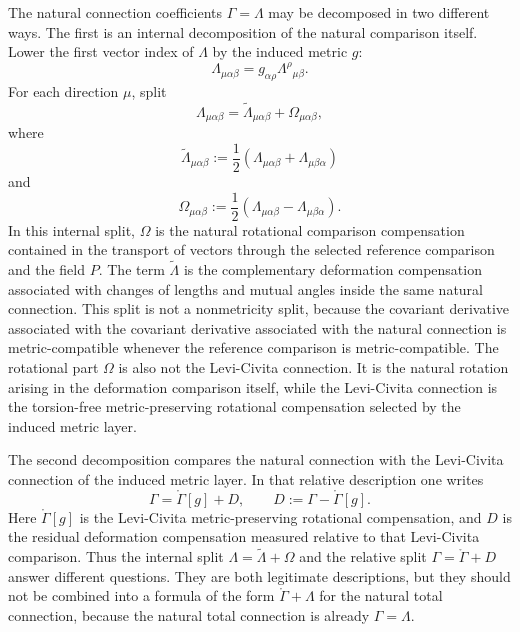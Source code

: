 \documentclass[12pt]{amsart}
\theoremstyle{definition}
\theoremstyle{remark}
\begin{document}
The natural connection coefficients \(\Gamma=\Lambda\) may be decomposed in two different ways.  The first is an internal decomposition of the natural comparison itself.  Lower the first vector index of \(\Lambda\) by the induced metric \(g\):
\begin{equation}
 \Lambda_{\mu\alpha\beta}=g_{\alpha\rho}\Lambda^\rho{}_{\mu\beta}.
\end{equation}
For each direction \(\mu\), split
\begin{equation}\label{eq:Lambda_split}
 \Lambda_{\mu\alpha\beta}
 =\widetilde\Lambda_{\mu\alpha\beta}+\Omega_{\mu\alpha\beta},
\end{equation}
where
\begin{equation}\label{eq:symmetric_Lambda}
 \widetilde\Lambda_{\mu\alpha\beta}:=\frac12(\Lambda_{\mu\alpha\beta}+\Lambda_{\mu\beta\alpha})
\end{equation}
and
\begin{equation}\label{eq:skew_Omega}
 \Omega_{\mu\alpha\beta}:=\frac12(\Lambda_{\mu\alpha\beta}-\Lambda_{\mu\beta\alpha}).
\end{equation}
In this internal split, \(\Omega\) is the natural rotational comparison compensation contained in the transport of vectors through the selected reference comparison and the field \(P\).  The term \(\widetilde\Lambda\) is the complementary deformation compensation associated with changes of lengths and mutual angles inside the same natural connection.  This split is not a nonmetricity split, because the covariant derivative associated with the covariant derivative associated with the natural connection is metric-compatible whenever the reference comparison is metric-compatible.  The rotational part \(\Omega\) is also not the Levi-Civita connection.  It is the natural rotation arising in the deformation comparison itself, while the Levi-Civita connection is the torsion-free metric-preserving rotational compensation selected by the induced metric layer.

The second decomposition compares the natural connection with the Levi-Civita connection of the induced metric layer.  In that relative description one writes
\begin{equation}\label{eq:LC_distortion_decomposition}
 \Gamma=\mathring\Gamma[g]+D,
 \qquad
 D:=\Gamma-\mathring\Gamma[g].
\end{equation}
Here \(\mathring\Gamma[g]\) is the Levi-Civita metric-preserving rotational compensation, and \(D\) is the residual deformation compensation measured relative to that Levi-Civita comparison.  Thus the internal split \(\Lambda=\widetilde\Lambda+\Omega\) and the relative split \(\Gamma=\mathring\Gamma+D\) answer different questions.  They are both legitimate descriptions, but they should not be combined into a formula of the form \(\mathring\Gamma+\Lambda\) for the natural total connection, because the natural total connection is already \(\Gamma=\Lambda\).
\end{document}
